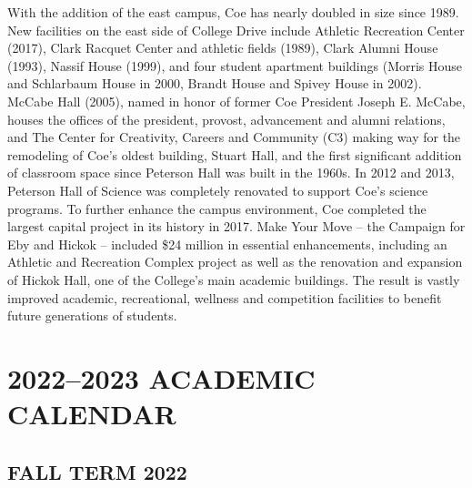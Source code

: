 \documentclass[
  letterpaper,
]{scrbook}
\renewcommand{\part}[1]{\addcontentsline{toc}{part}{#1}}
\begin{document}
With the addition of the east campus, Coe has nearly doubled in size
since 1989. New facilities on the east side of College Drive include
Athletic Recreation Center (2017), Clark Racquet Center and athletic
fields (1989), Clark Alumni House (1993), Nassif House (1999), and four
student apartment buildings (Morris House and Schlarbaum House in 2000,
Brandt House and Spivey House in 2002). McCabe Hall (2005), named in
honor of former Coe President Joseph E. McCabe, houses the offices of
the president, provost, advancement and alumni relations, and The Center
for Creativity, Careers and Community (C3) making way for the remodeling
of Coe's oldest building, Stuart Hall, and the first significant
addition of classroom space since Peterson Hall was built in the 1960s.
In 2012 and 2013, Peterson Hall of Science was completely renovated to
support Coe's science programs. To further enhance the campus
environment, Coe completed the largest capital project in its history in
2017. Make Your Move -- the Campaign for Eby and Hickok -- included \$24
million in essential enhancements, including an Athletic and Recreation
Complex project as well as the renovation and expansion of Hickok Hall,
one of the College's main academic buildings. The result is vastly
improved academic, recreational, wellness and competition facilities to
benefit future generations of students.

\part{ACADEMIC RESOURCES}

\chapter{2022--2023 ACADEMIC CALENDAR}\label{sec-academic-calenar}

\section{FALL TERM 2022}\label{fall-term-2022}
\end{document}
